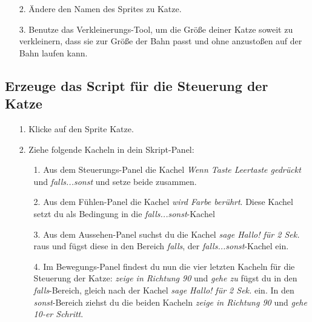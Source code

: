 \begin{itemize}
\item[2. ] Ändere den Namen des Sprites zu Katze.
\end{itemize}
\begin{itemize}
\item[3.] Benutze das Verkleinerungs-Tool, um die Größe deiner Katze soweit zu verkleinern, dass sie zur Größe der Bahn passt und ohne anzustoßen auf der Bahn laufen kann.
\end{itemize}


\subsection{Erzeuge das Script für die Steuerung der Katze}

\begin{itemize}
\item[1. ] Klicke auf den Sprite Katze.
\item[2. ] Ziehe folgende Kacheln in dein Skript-Panel:
  \begin{itemize}
  \item[1. ] Aus dem Steuerungs-Panel die Kachel \textit{Wenn Taste Leertaste gedrückt} und \textit{falls...sonst} und setze beide zusammen.
  \item[2. ] Aus dem Fühlen-Panel die Kachel \textit{wird Farbe berührt}. Diese Kachel setzt du als Bedingung in die \textit{falls...sonst}-Kachel
  \item[3. ] Aus dem Aussehen-Panel suchst du die Kachel \textit{sage Hallo! für 2 Sek.} raus und fügst diese in den Bereich \textit{falls}, der \textit{falls...sonst}-Kachel ein.
  \item[4. ] Im Bewegungs-Panel findest du nun die vier letzten Kacheln für die Steuerung der Katze: \textit{zeige in Richtung 90} und \textit{gehe zu} fügst du in den \textit{falls}-Bereich, gleich nach der Kachel \textit{sage Hallo! für 2 Sek.} ein. In den \textit{sonst}-Bereich ziehst du die beiden Kacheln \textit{zeige in Richtung 90} und \textit{gehe 10-er Schritt}.
  \end{itemize}
\end{itemize}

